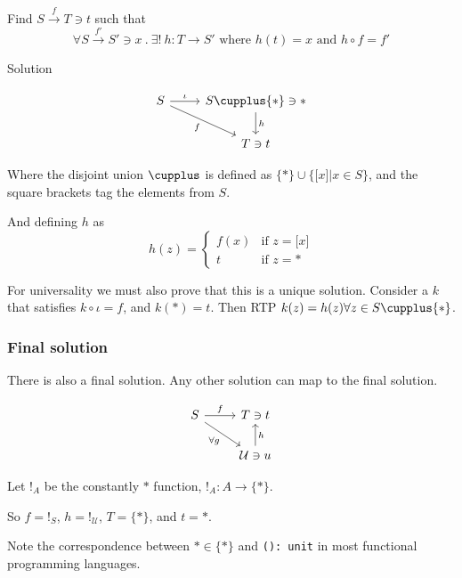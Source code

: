 \documentclass[a4paper, 12pt]{article}
\theoremstyle{definition}
\begin{document}
Find $S \overset{f}{\rightarrow} T \ni t$ such that
$$
\forall S \overset{f'}{\rightarrow} S' \ni x \ .\ 
\exists!\ h : T \rightarrow S' \text{ where }
h(t) = x \text{ and }
h \circ f = f'
$$

Solution

$$
    \begin{tikzcd}
        S \arrow[r, "\iota"]
          \arrow[dr, swap, "f"]
          & 
        S \cupplus \{\ast\} \ni \ast
          \arrow[d, "h"]
          \\
        {}
          &
        T \ni t
    \end{tikzcd}
$$

Where the disjoint union $\cupplus$ is defined as $\{\ast\} \cup \{ \lbrack
x\rbrack | x \in S \}$, and the square brackets tag the elements from $S$.

And defining $h$ as
\begin{equation*}
    h(z) = \begin{cases}
        f(x) & \text{if } z = \lbrack x \rbrack \\
        t & \text{if } z = \ast
    \end{cases}
\end{equation*}

For universality we must also prove that this is a unique solution.
Consider a $k$ that satisfies $k \circ \iota = f$, and $k(\ast) = t$. Then RTP
$k(z) = h(z) \forall z \in S \cupplus \{ \ast \}$.

\subsubsection*{Final solution}
There is also a final solution. Any other solution can map to the final
solution.

$$
    \begin{tikzcd}
        S \arrow[r, "f"]
          \arrow[dr, swap, "\forall g"]
          & 
        T \ni t
          \\
        {}
          &
        \mathcal{U} \ni u
          \arrow[u, swap, "h"]
    \end{tikzcd}
$$

Let $!_A$ be the constantly $\ast$ function, $!_A : A \rightarrow \{ \ast \}$.

So $f = !_S$, $h = !_{\mathcal{U}}$, $T = \{ \ast \}$, and $t = \ast$.

Note the correspondence between $\ast \in \{ \ast \}$ and \texttt{(): unit} in
most functional programming languages.
\end{document}
